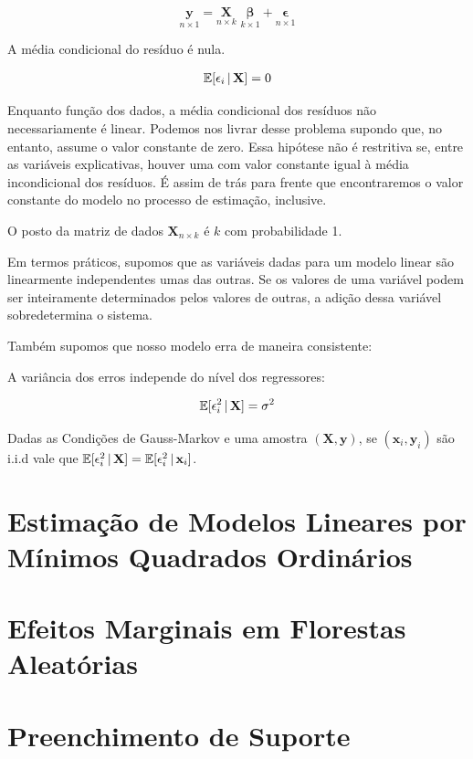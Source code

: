 \begin{equation}
    \underset{n \times 1}{\mathbf{y}} = \underset{n \times k}{\mathbf{X}} \,\, \underset{k \times 1}{\boldsymbol{\beta}}   + \underset{n \times 1}{\boldsymbol{\epsilon}}
\end{equation}



\begin{hipotese}
A média condicional do resíduo é nula.

\begin{align}
    \mathbb{E}[\epsilon_i \, | \, \mathbf{X}] = 0
\end{align}

Enquanto função dos dados, a média condicional dos resíduos não necessariamente é linear. Podemos nos livrar desse problema supondo que, no entanto, assume o valor constante de zero. Essa hipótese não é restritiva se, entre as variáveis explicativas, houver uma com valor constante igual à média incondicional dos resíduos. É assim de trás para frente que encontraremos o valor constante do modelo no processo de estimação, inclusive. 

\end{hipotese}

\begin{hipotese}
O posto da matriz de dados $\mathbf{X}_{n \times k}$ é $k$ com probabilidade 1.
\end{hipotese}

Em termos práticos, supomos que as variáveis dadas para um modelo linear são linearmente independentes umas das outras. Se os valores de uma variável podem ser inteiramente determinados pelos valores de outras, a adição dessa variável sobredetermina o sistema. 

Também supomos que nosso modelo erra de maneira consistente:

\begin{hipotese}[Homocedasticidade]
A variância dos erros independe do nível dos regressores:

\begin{align}
    \mathbb{E}[\epsilon_i^2\, |\, \mathbf{X} ] = \sigma^2
\end{align}


\end{hipotese}

Dadas as Condições de Gauss-Markov e uma amostra $(\mathbf{X}, \mathbf{y})$, se $(\mathbf{x}_i, \mathbf{y}_i)$ são i.i.d vale que $ \mathbb{E}[\epsilon_i^2\, |\, \mathbf{X} ] = \mathbb{E}[\epsilon_i^2\, |\, \mathbf{x}_i ]  $.









\section{Estimação de Modelos Lineares por Mínimos Quadrados Ordinários}

\section{Efeitos Marginais em Florestas Aleatórias}






\section{Preenchimento de Suporte}
